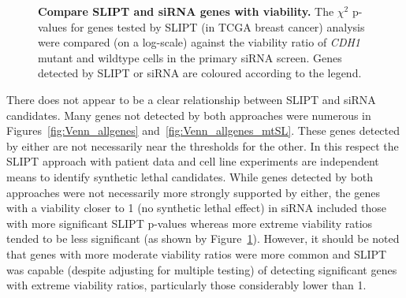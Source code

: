\begin{figure}[!htp]
\begin{center}
   \end{center}
   \caption[Compare SLIPT and \gls{siRNA} genes with viability]{\small \textbf{Compare \gls{SLIPT} and \gls{siRNA} genes with viability.} The $\chi^2$ p-values for genes tested by \gls{SLIPT} (in \gls{TCGA} breast cancer)  analysis were compared (on a log-scale) against the viability ratio of \textit{CDH1} \gls{mutant} and wildtype cells in the primary \gls{siRNA} screen. Genes detected by \gls{SLIPT} or \gls{siRNA} are coloured according to the legend.%
}
\label{fig:compare_points_viability_SL}
\end{figure}

There does not appear to be a clear relationship between \gls{SLIPT} and \gls{siRNA} candidates. Many genes not detected by both approaches were numerous in Figures~\ref{fig:Venn_allgenes} and~\ref{fig:Venn_allgenes_mtSL}. These genes detected by either are not necessarily near the thresholds for the other. In this respect the \gls{SLIPT} approach with patient data and cell line experiments are independent means to identify \gls{synthetic lethal} candidates. While genes detected by both approaches were not necessarily more strongly supported by either, the genes with a viability closer to 1 (no \gls{synthetic lethal} effect) in \gls{siRNA} included those with more significant \gls{SLIPT} p-values whereas more extreme viability ratios tended to be less significant (as shown by Figure~\ref{fig:compare_points_viability_SL}). However, it should be noted that genes with more moderate viability ratios were more common and \gls{SLIPT} was capable (despite adjusting for multiple testing) of detecting significant genes with extreme viability ratios, particularly those considerably lower than 1. 

